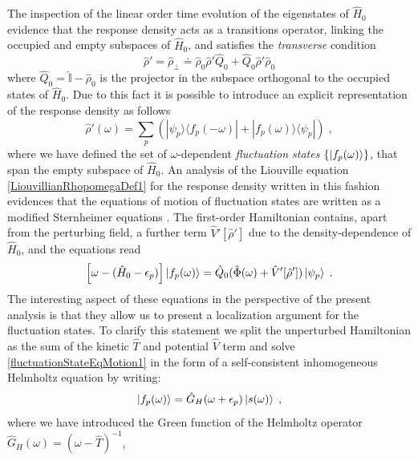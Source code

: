 \documentclass[reprint,aps,prb]{revtex4-1}
\newcommand{\eps}{\epsilon}
\newcommand{\be}{\begin{equation}}
\newcommand{\ee}{\end{equation}}
\newcommand{\lb}{\label}
\newcommand{\op}[1]{\hat {#1}}
\newcommand{\ketbra}[2]{| #1 \rangle \langle #2 |}
\newcommand{\dmnot}{\op{\rho}_0}
\newcommand{\dm}{\op{\rho}}
\newcommand{\hnot}{\op{H}_0}
\newcommand{\identity}{\op{\mathbb I}}
\begin{document}
The inspection of the linear order time evolution of the eigenstates of $\hnot$ evidence that the response density acts as a transitions operator, linking the occupied and empty subspaces 
of $\hnot$, and satisfies the \emph{transverse} condition  
\be\lb{RhopTransverseDef1}
\dm' = \dm_{\perp} \doteq \dmnot\dm'\op Q_0 + \op Q_0\dm'\dmnot
\ee
where $\op Q_0=\identity-\dmnot$ is the projector in the subspace orthogonal to the occupied states of $\hnot$. Due to this fact it is possible to introduce an explicit representation of the 
response density as follows 
\be\lb{rhoPrimeFluctuationStateDef1}
\dm'(\omega) = \sum_p\left(\ketbra{\psi_p}{f_p(-\omega)} + \ketbra{f_p(\omega)}{\psi_p}\right) \;,
\ee
where we have defined the set of $\omega$-dependent \emph{fluctuation states} $\{\ket{f_p(\omega)}\}$, that span the empty subspace of $\hnot$. 
An analysis of the Liouville equation \eqref{LiouvillianRhopomegaDef1} for the response density written in this fashion evidences that the equations of motion of fluctuation states are 
written as a modified Sternheimer equations \cite{mahan1980}. The first-order Hamiltonian contains, apart from the perturbing field, a further term $\op V'[\dm']$ due to the density-dependence 
of $\hnot$, and the equations read
\be\lb{fluctuationStateEqMotion1}
\left[\omega - (\hnot-\eps_p)\right]\ket{f_p(\omega)} = \op Q_0(\op\Phi(\omega)+\op V'[\dm'])\ket{\psi_p} \;.
\ee
The interesting aspect of these equations in the perspective of the present analysis is that they allow us to present a localization argument for the fluctuation 
states. To clarify this statement we split the unperturbed Hamiltonian as the sum of the kinetic $\op T$ and potential $\op V$ term and solve \eqref{fluctuationStateEqMotion1} in the form 
of a self-consistent inhomogeneous Helmholtz equation by writing:
\be\lb{rhoPrimeFluctuationStateDef2}
\ket{f_p(\omega)} = \op G_H(\omega+\epsilon_p)\ket{s(\omega)} \;,
\ee
where we have introduced the Green function of the Helmholtz operator $\op G_H(\omega) = (\omega-\op T)^{-1}$,
\end{document}
